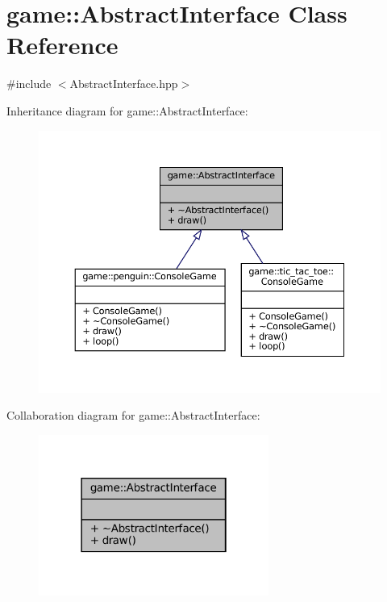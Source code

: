 \hypertarget{classgame_1_1_abstract_interface}{}\section{game\+:\+:Abstract\+Interface Class Reference}
\label{classgame_1_1_abstract_interface}


{\ttfamily \#include $<$Abstract\+Interface.\+hpp$>$}



Inheritance diagram for game\+:\+:Abstract\+Interface\+:
\nopagebreak
\begin{figure}[H]
\begin{center}
\leavevmode
\includegraphics[width=350pt]{classgame_1_1_abstract_interface__inherit__graph}
\end{center}
\end{figure}


Collaboration diagram for game\+:\+:Abstract\+Interface\+:
\nopagebreak
\begin{figure}[H]
\begin{center}
\leavevmode
\includegraphics[width=214pt]{classgame_1_1_abstract_interface__coll__graph}
\end{center}
\end{figure}
